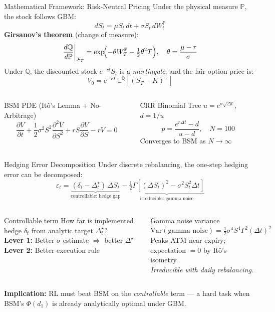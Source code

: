 \documentclass[aspectratio=169,10pt]{beamer}
\begin{document}
\begin{frame}{Mathematical Framework: Risk-Neutral Pricing}
Under the physical measure $\mathbb{P}$, the stock follows GBM:
\[
  dS_t = \mu S_t\,dt + \sigma S_t\,dW_t^{\mathbb{P}}
\]
\textbf{Girsanov's theorem} (change of measure):
\[
  \frac{d\mathbb{Q}}{d\mathbb{P}}\bigg|_{\mathcal{F}_T}
  = \exp\!\Bigl(-\theta W_T^{\mathbb{P}} - \tfrac{1}{2}\theta^2 T\Bigr),
  \quad \theta = \frac{\mu - r}{\sigma}
\]
Under $\mathbb{Q}$, the discounted stock $e^{-rt}S_t$ is a \emph{martingale}, and the fair option price is:
\[
  V_0 = e^{-rT}\,\mathbb{E}^{\mathbb{Q}}\!\left[(S_T - K)^+\right]
\]
\begin{columns}[T]
\begin{block}{BSM PDE (Itô's Lemma + No-Arbitrage)}
\[
  \frac{\partial V}{\partial t} + \frac{1}{2}\sigma^2 S^2 \frac{\partial^2 V}{\partial S^2}
  + rS\frac{\partial V}{\partial S} - rV = 0
\]
\end{block}
\begin{block}{CRR Binomial Tree}
$u = e^{\sigma\sqrt{\Delta t}}$,\quad $d = 1/u$
\[
  p = \frac{e^{r\Delta t}-d}{u-d}, \quad N=100
\]
Converges to BSM as $N\to\infty$
\end{block}
\end{columns}
\end{frame}

\begin{frame}{Hedging Error Decomposition}
Under discrete rebalancing, the one-step hedging error can be decomposed:
\[
  \varepsilon_t = \underbrace{(\delta_t - \Delta_t^\star)\,\Delta S_t}_{\text{controllable: hedge gap}}
               - \underbrace{\tfrac{1}{2}\Gamma\left[(\Delta S_t)^2 - \sigma^2 S_t^2 \Delta t\right]}_{\text{irreducible: gamma noise}}
\]

\begin{columns}[T]
\begin{alertblock}{Controllable term}
How far is implemented hedge $\delta_t$ from analytic target $\Delta_t^\star$?\\[0.3em]
\textbf{Lever 1:} Better $\sigma$ estimate $\Rightarrow$ better $\Delta^\star$\\
\textbf{Lever 2:} Better execution rule
\end{alertblock}

\begin{block}{Gamma noise variance}
\[
  \mathrm{Var}(\text{gamma noise}) = \tfrac{1}{2}\sigma^4 S^4 \Gamma^2 (\Delta t)^2
\]
Peaks ATM near expiry; expectation $= 0$ by Itô's isometry.\\
\emph{Irreducible with daily rebalancing.}
\end{block}
\end{columns}

\medskip
\textbf{Implication:} RL must beat BSM on the \emph{controllable} term — a hard task when BSM's $\Phi(d_1)$ is already analytically optimal under GBM.
\end{frame}
\end{document}
